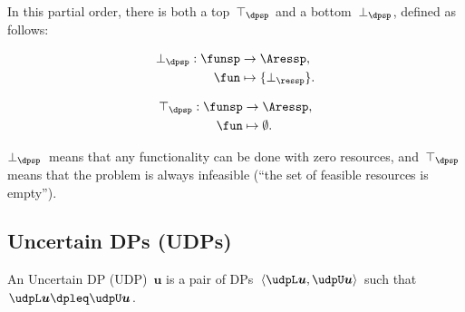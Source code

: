 In this partial order, there is both a top~$\top_{\dpsp}$ and a
bottom~$\bot_{\dpsp}$, defined as follows:

\vspace{-5mm}

\begin{minipage}[t]{0.4\columnwidth}
\begin{align*}
\bot_{\dpsp}:\funsp & \rightarrow\Aressp,\\
\fun & \mapsto\{\bot_{\ressp}\}.
\end{align*}

\end{minipage}
\begin{minipage}[t]{0.4\columnwidth}
\begin{align}
\top_{\dpsp}:\funsp & \rightarrow\Aressp,\nonumber \\
\fun & \mapsto\emptyset.\label{eq:top}
\end{align}

\end{minipage}

\smallskip{}

$\bot_{\dpsp}$~means that any functionality can be done with zero
resources, and~$\top_{\dpsp}$ means that the problem is always infeasible
(``the set of feasible resources is empty'').

\subsection{Uncertain DPs (UDPs)}
\begin{definition}
An Uncertain DP (UDP)~$\boldsymbol{u}$ is a pair of DPs~$\langle\udpL\boldsymbol{u},\udpU\boldsymbol{u}\rangle$
such that~$\udpL\boldsymbol{u}\dpleq\udpU\boldsymbol{u}$.
\end{definition}



